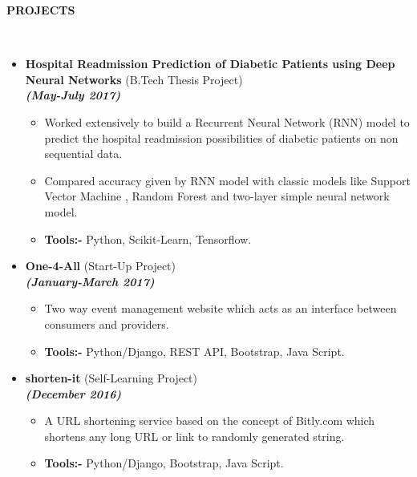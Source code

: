 \documentclass[a4paper,10pt]{article}
\newcommand{\isep}{-2 pt}
\newcommand{\lsep}{-0.5cm}
\newcommand{\resheading}[1]{{\small \colorbox{mygrey}{\begin{minipage}{0.975\textwidth}{\textbf{#1 \vphantom{p\^{E}}}}\end{minipage}}}}
\begin{document}
\resheading{\textbf{PROJECTS } }\\[\lsep]
\begin{itemize}
\item \textbf{Hospital Readmission Prediction of Diabetic Patients using Deep Neural Networks
} (B.Tech Thesis Project) \\
 \emph \textbf{(May-July 2017)} \\[-0.6cm]
	\begin{itemize}\itemsep \isep
	
	\item Worked extensively to build a Recurrent Neural Network (RNN) model to predict the hospital readmission possibilities of diabetic patients on non sequential data. 
    \item Compared accuracy given by RNN model with classic models like Support Vector Machine , Random Forest and two-layer simple neural network model.
    \item \textbf{Tools:-} Python, Scikit-Learn, Tensorflow.

	\end{itemize}

\item \textbf{One-4-All
} (Start-Up Project)  \\
 \emph \textbf{(January-March 2017)} \\[-0.6cm]
	\begin{itemize}\itemsep \isep
	\item Two way event management website which acts as an interface between consumers and providers.
	\item \textbf {Tools:-} Python/Django, REST API, Bootstrap, Java Script.
	\end{itemize}
\end{itemize}


\begin{itemize}
\item \textbf{shorten-it
}  (Self-Learning Project)\\
 \emph \textbf{(December 2016)} \\[-0.6cm]
	\begin{itemize}\itemsep \isep
	\item A URL shortening service based on the concept of Bitly.com which shortens any long URL or link to randomly generated string. 
	\item\textbf {Tools:-} Python/Django, Bootstrap, Java Script.
	\end{itemize}
\end{itemize}
\end{document}
